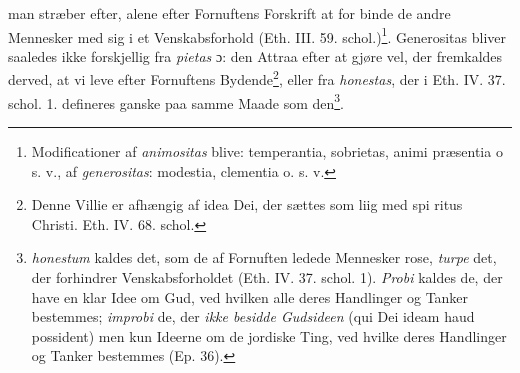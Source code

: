 \documentclass[12pt,a4paper]{book}
\begin{document}
man stræber efter, alene efter Fornuftens Forskrift at for\-%
binde de andre Mennesker med sig i et Venskabsforhold
(Eth. III. 59. schol.)\footnote{Modificationer af \emph{animositas} blive: temperantia, sobrietas, animi
præsentia o s. v., af \emph{generositas}: modestia, clementia o. s. v.}. Generositas bliver saaledes ikke
forskjellig fra \emph{pietas} ɔ: den Attraa efter at gjøre vel, der
fremkaldes derved, at vi leve efter Fornuftens Bydende\footnote{Denne Villie er afhængig af idea Dei, der sættes som liig med spi\-%
ritus Christi. Eth. IV. 68. schol.},
eller fra \emph{honestas}, der i Eth. IV. 37. schol. 1. defineres
ganske paa samme Maade som den\footnote{\emph{honestum} kaldes det, som de af Fornuften ledede Mennesker
rose, \emph{turpe} det, der forhindrer Venskabsforholdet (Eth. IV. 37.
schol. 1). \emph{Probi} kaldes de, der have en klar Idee om Gud, ved
hvilken alle deres Handlinger og Tanker bestemmes; \emph{improbi} de,
der \emph{ikke besidde Gudsideen} (qui Dei ideam haud possident)
men kun Ideerne om de jordiske Ting, ved hvilke deres Handlinger
og Tanker bestemmes (Ep. 36).}.
\end{document}
